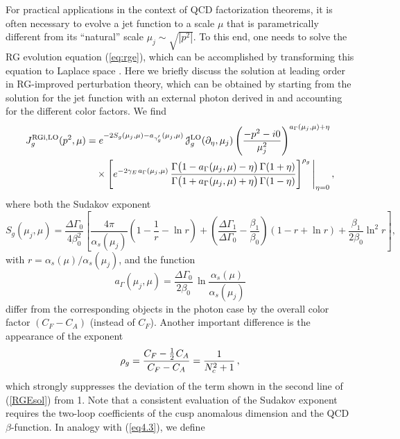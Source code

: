 \documentclass[12pt]{article}
\newcommand{\J}{{\EuScript J}}
\newcommand{\spac}{{\hspace{0.3mm}}}
\numberwithin{equation}{section}
\begin{document}
For practical applications in the context of QCD factorization theorems, it is often necessary to evolve a jet function to a scale $\mu$ that is parametrically different from its ``natural'' scale $\mu_j\sim\sqrt{|p^2|}$. To this end, one needs to solve the RG evolution equation (\ref{eq:rge}), which can be accomplished by transforming this equation to Laplace space \cite{Bosch:2003fc,Lange:2003ff,Galda:2020epp}. Here we briefly discuss the solution at leading order in RG-improved perturbation theory, which can be obtained by starting from the solution for the jet function with an external photon derived in \cite{Liu:2020ydl} and accounting for the different color factors. We find
\begin{equation}\label{RGEsol}
\begin{aligned}
   J_g^{\text{RGi,LO}}(p^2,\mu)
   &= e^{-2S_g(\mu_j,\mu)-a_{\gamma_g'}(\mu_j,\mu)}\,\J_g^{\text{LO}}(\partial_\eta,\mu_j)
    \left( \frac{-p^2-i0}{\mu_j^2} \right)^{a_\Gamma(\mu_j,\mu)+\eta} \\
   &\quad\times
    \left[ e^{-2\gamma_E\spac a_\Gamma(\mu_j,\mu)}\,
    \frac{\Gamma\big(1-a_\Gamma(\mu_j,\mu)-\eta\big)\,\Gamma(1+\eta)}%
         {\Gamma\big(1+a_\Gamma(\mu_j,\mu)+\eta\big)\,\Gamma(1-\eta)} \right]^{\rho_g} \Bigg|_{\eta=0} \,, 
\end{aligned}
\end{equation}
where both the Sudakov exponent
\begin{equation}
   S_g(\mu_j,\mu) = \frac{\Delta\Gamma_0}{4\beta_0^2}
    \left[ \frac{4\pi}{\alpha_s(\mu_j)} \left( 1 - \frac{1}{r} - \ln r \right)
    + \left( \frac{\Delta\Gamma_1}{\Delta\Gamma_0} - \frac{\beta_{1}}{\beta_{0}} \right) (1 - r + \ln r)
    + \frac{\beta_1}{2\beta_0} \ln^2 r \right] ,
\end{equation}
with $r=\alpha_s(\mu)/\alpha_s(\mu_j)$, and the function
\begin{equation}\label{eq4.3}
   a_\Gamma(\mu_j,\mu) = \frac{\Delta\Gamma_0}{2\beta_0}\,\ln\frac{\alpha_s(\mu)}{\alpha_s(\mu_j)}
\end{equation}
differ from the corresponding objects in the photon case by the overall color factor $(C_F-C_A)$ (instead of $C_F$). Another important difference is the appearance of the exponent
\begin{equation}
   \rho_g = \frac{C_F-\frac12\spac C_A}{C_F-C_A} = \frac{1}{N_c^2+1} \,,
\end{equation}
which strongly suppresses the deviation of the term shown in the second line of (\ref{RGEsol}) from 1. Note that a consistent evaluation of the Sudakov exponent requires the two-loop coefficients of the cusp anomalous dimension and the QCD $\beta$-function. In analogy with (\ref{eq4.3}), we define
\end{document}
